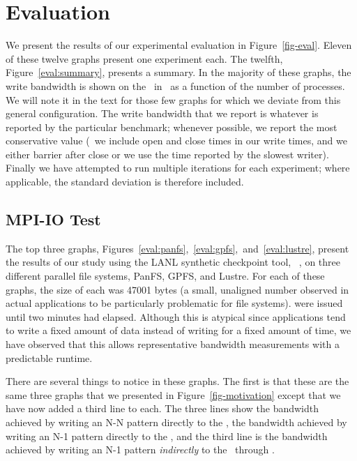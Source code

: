 \section{Evaluation}
\label{eval}



We present the results of our experimental evaluation in Figure~\ref{fig-eval}.
Eleven of these twelve graphs present one experiment each. The twelfth,
Figure~\ref{eval:summary}, presents a summary. In the majority of these graphs,
the write bandwidth is shown on the \yaxis\ in \MBs\ as a function of the
number of processes. We will note it in the text for those few graphs for
which we deviate from this general configuration. The write bandwidth that we
report is whatever is reported by the particular benchmark; whenever possible,
we report the most conservative value (\ie\ we include open and close times in
our write times, and we either barrier after close or we use the time reported
by the slowest writer). Finally we have attempted to run multiple iterations
for each experiment; where applicable, the standard deviation is therefore
included.

\subsection{MPI-IO Test}

The top three graphs, 
Figures~\ref{eval:panfs},~\ref{eval:gpfs},~and~\ref{eval:lustre}, present the
results of our study using the LANL synthetic checkpoint tool, ~\cite{mpi-io-test}, on three different parallel file systems, PanFS, GPFS,
and Lustre. For each of these graphs, the size of each  was
47001 bytes (a small, unaligned number observed in actual applications to be
particularly problematic for file systems).  were
issued until two minutes had elapsed. Although this is atypical since 
applications tend to write a fixed amount of data instead of writing for
a fixed amount of time, we have observed that this allows representative 
bandwidth measurements with a predictable runtime. 

There are several things to notice in these graphs. The first is that these
are the same three graphs that we presented in Figure~\ref{fig-motivation}
except that we have now added a third line to each. The three lines show the
bandwidth achieved by writing an N-N pattern directly to the \upfs, the
bandwidth achieved by writing an N-1 pattern directly to the \upfs, and the
third line is the bandwidth achieved by writing an N-1 pattern {\em indirectly}
to the \upfs\ through \plfs.

